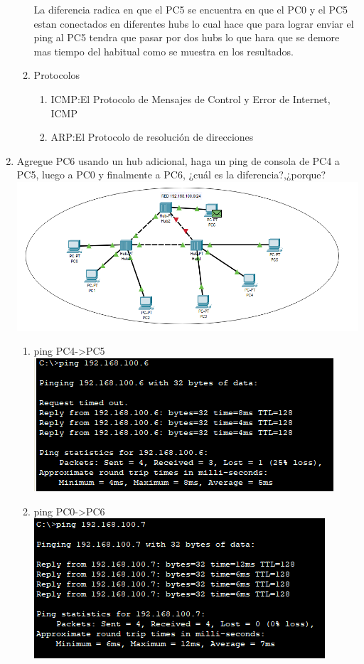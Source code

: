 \documentclass[11pt]{article}
\begin{document}
\begin{enumerate}
\begin{enumerate}
        La diferencia radica en que el PC5 se encuentra en que el PC0 y el PC5 estan conectados en diferentes hubs lo cual hace que para lograr enviar el ping  al PC5 tendra que pasar por dos hubs lo que hara que se demore mas tiempo del habitual como se muestra en los resultados.
        \item Protocolos\\
        \begin{enumerate}
            \item ICMP:El Protocolo de Mensajes de Control y Error de Internet, ICMP
            \item ARP:El Protocolo de resolución de direcciones
        \end{enumerate}
    \end{enumerate}
    \item Agregue PC6 usando un hub adicional, haga un ping de consola de PC4 a PC5, luego a PC0 y finalmente a PC6, ¿cuál es la diferencia?,¿porque?\\
    \includegraphics[scale=0.5]{Act/4.PNG}
    \begin{enumerate}
        \item ping PC4->PC5\\
        \includegraphics[scale=1]{Act/4_1.PNG}
        \item ping PC0->PC6\\
        \includegraphics[scale=1]{Act/4_2.PNG}

\end{enumerate}
\end{enumerate}
\end{document}

